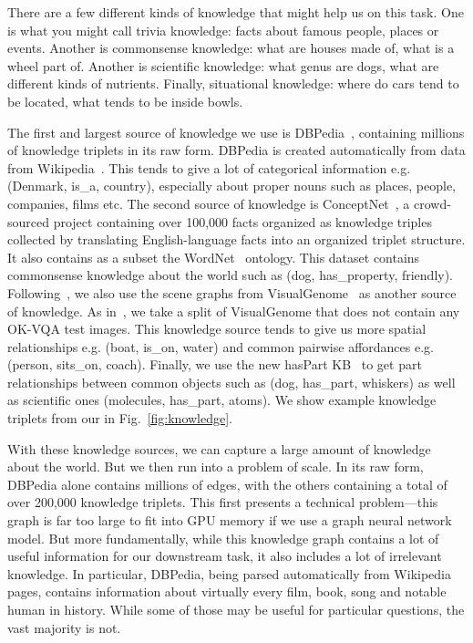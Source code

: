 \documentclass[final]{cvpr}
\begin{document}
There are a few different kinds of knowledge that might help us on this task. One is what you might call trivia knowledge: facts about famous people, places or events. Another is commonsense knowledge: what are houses made of, what is a wheel part of. Another is scientific knowledge: what genus are dogs, what are different kinds of nutrients. Finally, situational knowledge: where do cars tend to be located, what tends to be inside bowls. 

The first and largest source of knowledge we use is DBPedia~\cite{auer2007dbpedia}, containing millions of knowledge triplets in its raw form. DBPedia is created automatically from data from Wikipedia~\cite{wikipedia}. This tends to give a lot of categorical information e.g. (Denmark, is\_a, country), especially about proper nouns such as places, people, companies, films etc. The second source of knowledge is ConceptNet~\cite{liu2004conceptnet}, a crowd-sourced project containing over 100,000 facts organized as knowledge triples collected  by translating English-language facts into an organized triplet structure. It also contains as a subset the WordNet~\cite{Miller95} ontology. This dataset contains commonsense knowledge about the world such as (dog, has\_property, friendly). Following~\cite{marino17}, we also use the scene graphs from VisualGenome~\cite{krishnavisualgenome} as another source of knowledge. As in~\cite{marino17}, we take a split of VisualGenome that does not contain any OK-VQA test images. This knowledge source tends to give us more spatial relationships e.g. (boat, is\_on, water) and common pairwise affordances e.g. (person, sits\_on, coach). Finally, we use the new hasPart KB~\cite{bhakthavatsalam2020dogs} to get part relationships between common objects such as (dog, has\_part, whiskers) as well as scientific ones (molecules, has\_part, atoms). We show example knowledge triplets from our in Fig.~\ref{fig:knowledge}. 

With these knowledge sources, we can capture a large amount of knowledge about the world. But we then run into a problem of scale. In its raw form, DBPedia alone contains millions of edges, with the others containing a total of over 200,000 knowledge triplets. This first presents a technical problem---this graph is far too large to fit into GPU memory if we use a graph neural network model. But more fundamentally, while this knowledge graph contains a lot of useful information for our downstream task, it also includes a lot of irrelevant knowledge. In particular, DBPedia, being parsed automatically from Wikipedia pages, contains information about virtually every film, book, song and notable human in history. While some of those may be useful for particular questions, the vast majority is not.
\end{document}
